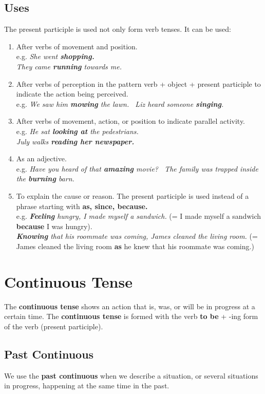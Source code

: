 \documentclass[hidelinks,10pt,a4paper]{article}
\begin{document}
\subsection{Uses}
The present participle is used not only form verb tenses. It can be used:
\begin{enumerate}[label=(\alph*)]
	\item After verbs of movement and position. \\
		e.g. \textit{ She went \textbf{shopping. \\
			} They came \textbf{running} towards me. }
	\item After verbs of perception in the pattern verb + object + present participle to indicate the action being perceived. \\
		e.g. \textit{We saw him \textbf{mowing} the lawn. \
		Liz heard someone \textbf{singing}.}
	\item After verbs of movement, action, or position to indicate parallel activity. \\
		e.g. \textit{He sat \textbf{looking at} the pedestrians. \\
		July walks \textbf{reading her newspaper.} }
	\item As an adjective. \\
		e.g. \textit{Have you heard of that \textbf{amazing} movie? \
		The family was trapped inside the \textbf{burning} barn.}
	\item To explain the cause or reason. The present participle is used instead of a phrase starting with \textbf{as, since, because.} \\
		e.g. \textit{ \textbf{Feeling} hungry, I made myself a sandwich.} (= I made myself a sandwich \textbf{because} I was hungry). \\
		\textit{ \textbf{Knowing} that his roommate was coming, James cleaned the living room.} (= James cleaned the living room \textbf{as} he knew that his roommate was coming.)
\end{enumerate}


\section{Continuous Tense}
The \textbf{continuous tense} shows an action that is, was, or will be in progress at a certain time. The \textbf{continuous tense} is formed with the verb \textbf{to be} + -ing form of the verb (present participle).

\subsection{Past Continuous}
We use the \textbf{past continuous} when we describe a situation, or several situations in progress, happening at the same time in the past.
\end{document}
